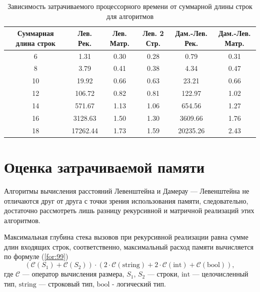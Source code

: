 \documentclass{report}
\begin{document}
\begin{table}[h!p]
	\begin{center}
		\caption{\label{tbl:time_test}Зависимость затрачиваемого процессорного времени от суммарной длины строк для алгоритмов}
		\label{tb:times}
		\begin{tabular}{|c|c|c|c|c|c|}
			\hline
			Суммарная длина строк & Лев. Рек. & Лев. Матр. & Лев. 2 Стр. & Дам.-Лев. Рек. & Дам.-Лев. Матр. \\ 
			\hline
            6 & 1.31 & 0.30 & 0.28 & 0.79 & 0.31 \\ 
            \hline
            8 & 3.79 & 0.41 & 0.38 & 4.34 & 0.47  \\ 
            \hline
            10 & 19.92 & 0.66 & 0.63 & 23.21 & 0.66  \\ 
            \hline
            12 & 106.72 & 0.82 & 0.81 & 122.97 & 1.02  \\ 
            \hline
            14 & 571.67 & 1.13 & 1.06 & 654.56 & 1.27  \\ 
            \hline
            16 & 3128.63 & 1.50 & 1.30 & 3609.66 & 1.76 \\ 
            \hline
            18 & 17262.44 & 1.73 & 1.59 & 20235.26 & 2.43 \\ 
            \hline
		\end{tabular}
	\end{center}
\end{table}

\section{Оценка затрачиваемой памяти}

Алгоритмы вычисления расстояний Левенштейна и Дамерау — Левенштейна не отличаются друг от друга с точки зрения использования памяти, следовательно, достаточно рассмотреть лишь разницу рекурсивной и матричной реализаций этих алгоритмов.

Максимальная глубина стека вызовов при рекурсивной реализации равна сумме длин входящих строк, соответственно, максимальный расход памяти вычисляется по формуле (\ref{for:99})
\begin{equation}
	(\mathcal{C}(S_1) + \mathcal{C}(S_2)) \cdot (2 \cdot \mathcal{C}\mathrm{(string)} + 2 \cdot \mathcal{C}\mathrm{(int)} + \mathcal{C}\mathrm{(bool)}),
	\label{for:99}
\end{equation}
где $\mathcal{C}$ — оператор вычисления размера, $S_1$, $S_2$ — строки, $\mathrm{int}$ — целочисленный тип, $\mathrm{string}$ — строковый тип,  $\mathrm{bool}$ - логический тип.
\end{document}
